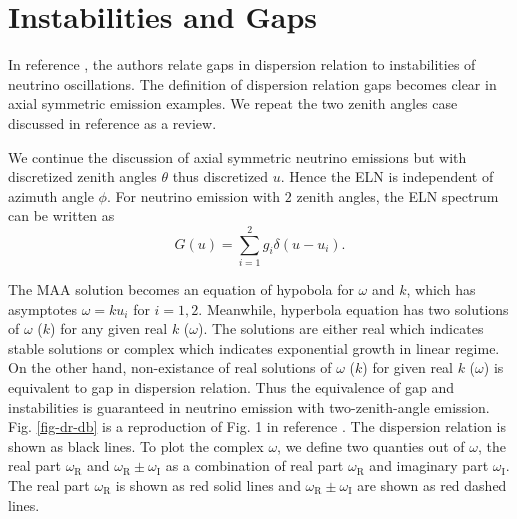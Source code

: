 \documentclass[%
preprint,
 amsmath,amssymb,
 aps,
 prd
]{revtex4-1}
\begin{document}






\section{\label{sec-instabilities-and-gaps}Instabilities and Gaps}

In reference , the authors relate gaps in dispersion relation to instabilities of neutrino oscillations. The definition of dispersion relation gaps becomes clear in axial symmetric emission examples. We repeat the two zenith angles case discussed in reference  as a review.

We continue the discussion of axial symmetric neutrino emissions but with discretized zenith angles $\theta$ thus discretized $u$. Hence the ELN is independent of azimuth angle $\phi$. For neutrino emission with $2$ zenith angles, the ELN spectrum can be written as
\begin{equation}
G(u)= \sum_{i=1}^2 g_i \delta(u - u_i).
\end{equation}

The MAA solution becomes an equation of hypobola for $\omega$ and $k$, which has asymptotes $\omega = k u_i$ for $i=1,2$. Meanwhile, hyperbola equation has two solutions of $\omega$ ($k$) for any given real $k$ ($\omega$). The solutions are either real which indicates stable solutions or complex which indicates exponential growth in linear regime. On the other hand, non-existance of real solutions of $\omega$ ($k$) for given real $k$ ($\omega$) is equivalent to gap in dispersion relation. Thus the equivalence of gap and instabilities is guaranteed in neutrino emission with two-zenith-angle emission. Fig. \ref{fig-dr-db} is a reproduction of Fig. 1 in reference . The dispersion relation is shown as black lines. To plot the complex $\omega$, we define two quanties out of $\omega$, the real part $\omega_{\mathrm R}$ and $\omega_{\mathrm R}\pm \omega_{\mathrm I}$ as a combination of real part $\omega_{\mathrm R}$ and imaginary part $\omega_{\mathrm I}$. The real part $\omega_{\mathrm R}$ is shown as red solid lines and $\omega_{\mathrm R}\pm \omega_{\mathrm I}$ are shown as red dashed lines.
\end{document}
